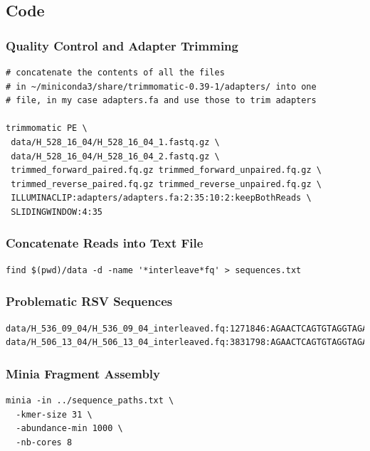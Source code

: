 \documentclass[10pt, a4paper]{article}
\begin{document}
\begin{appendices}
\subsection{Code}
\label{sec:orgff059a0}

\subsubsection{Quality Control and Adapter Trimming}
\label{sec:org56a1a85}
\begin{verbatim}
# concatenate the contents of all the files
# in ~/miniconda3/share/trimmomatic-0.39-1/adapters/ into one
# file, in my case adapters.fa and use those to trim adapters

trimmomatic PE \
 data/H_528_16_04/H_528_16_04_1.fastq.gz \
 data/H_528_16_04/H_528_16_04_2.fastq.gz \
 trimmed_forward_paired.fq.gz trimmed_forward_unpaired.fq.gz \
 trimmed_reverse_paired.fq.gz trimmed_reverse_unpaired.fq.gz \
 ILLUMINACLIP:adapters/adapters.fa:2:35:10:2:keepBothReads \
 SLIDINGWINDOW:4:35
\end{verbatim}

\subsubsection{Concatenate Reads into Text File}
\label{sec:org6b788ef}
\begin{verbatim}
find $(pwd)/data -d -name '*interleave*fq' > sequences.txt
\end{verbatim}

\subsubsection{Problematic RSV Sequences}
\label{sec:org038c0fd}
\begin{verbatim}
data/H_536_09_04/H_536_09_04_interleaved.fq:1271846:AGAACTCAGTGTAGGTAGAATGGTTGGCTGATCAATATCTCTAATGATTTTGGTCTGTGAATCAACTGTCATAAGAGAATTCTATCAAAGTTGAATTCCGAATCCTTGGGTCAATGACTGGGTGCACCCATTCTTCTAATGTGCTCTGTC
data/H_506_13_04/H_506_13_04_interleaved.fq:3831798:AGAACTCAGTGTAGGTAGAATGGTTGGCTGAGTAGGTAGATGGAGGCAGGTGCATGTGTGATGGGAAGTGTGGTGACGGGTTGTGTGGGCACACGGGATGAGGCGCAGATGGCTGGGGGTTTGGGAGGGGAATGGGTGGGAGAAGGAGGC
\end{verbatim}

\subsubsection{Minia Fragment Assembly}
\label{sec:org0a0135e}
\begin{verbatim}
minia -in ../sequence_paths.txt \
  -kmer-size 31 \
  -abundance-min 1000 \
  -nb-cores 8
\end{verbatim}


\end{appendices}
\end{document}
